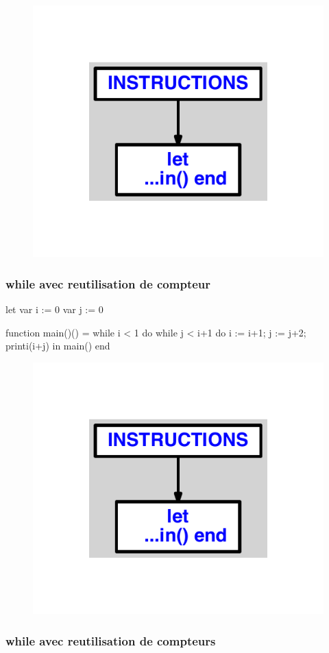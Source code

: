 \documentclass{article}
\begin{document}
\begin{figure}[H]\centering\includegraphics[max width=\textwidth]{ast/ast_328.pdf}\end{figure}\subsubsection{while avec reutilisation de compteur}
\begin{verbatimtab}
let
	var i := 0
	var j := 0

	function main()() =
		while i < 1 do
			while j < i+1 do
				i := i+1;
				j := j+2;
				printi(i+j)
in main() end
\end{verbatimtab}
\begin{figure}[H]\centering\includegraphics[max width=\textwidth]{ast/ast_329.pdf}\end{figure}\subsubsection{while avec reutilisation de compteurs}
\end{document}
